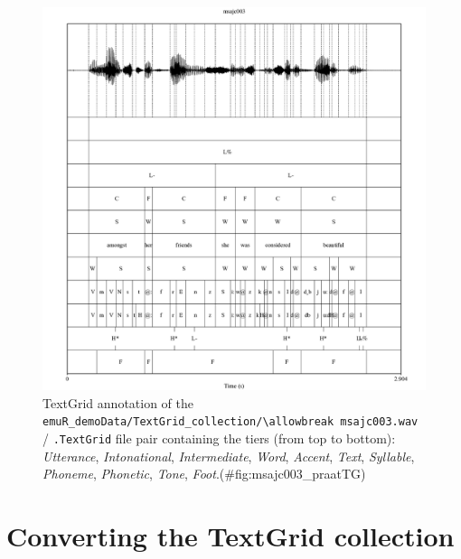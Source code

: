 \documentclass[]{book}
\theoremstyle{definition}
\theoremstyle{definition}
\theoremstyle{definition}
\theoremstyle{remark}
\begin{document}
\begin{figure}
\centering
\includegraphics{pics/msajc003_praat.png}
\caption{TextGrid annotation of the
\texttt{emuR\_demoData/TextGrid\_collection/\textbackslash{}allowbreak\ msajc003.wav}
/ \texttt{.TextGrid} file pair containing the tiers (from top to
bottom): \emph{Utterance}, \emph{Intonational}, \emph{Intermediate},
\emph{Word}, \emph{Accent}, \emph{Text}, \emph{Syllable},
\emph{Phoneme}, \emph{Phonetic}, \emph{Tone},
\emph{Foot}.(\#fig:msajc003\_praatTG)}
\end{figure}

\section{Converting the TextGrid
collection}\label{converting-the-textgrid-collection}
\end{document}
